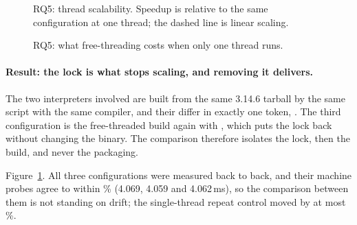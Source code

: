 \begin{figure}[t]
  \centering
  \caption{RQ5: thread scalability. Speedup is relative to the same configuration at one
    thread; the dashed line is linear scaling.}
  \label{fig:threads}
\end{figure}

\begin{figure}[t]
  \centering
  \caption{RQ5: what free-threading costs when only one thread runs.}
  \label{fig:fttax}
\end{figure}

\paragraph{Result: the lock is what stops scaling, and removing it delivers.}
The two interpreters involved are built from the same 3.14.6 tarball by the same script with
the same compiler, and their  differ in exactly one token,
. The third configuration is the free-threaded build again with
, which puts the lock back without changing the binary. The comparison
therefore isolates the lock, then the build, and never the packaging.

Figure~\ref{fig:threads}. All three configurations were measured back to back, and their
machine probes agree to within \% (4.069, 4.059 and 4.062\,ms), so the comparison between
them is not standing on drift; the single-thread repeat control moved by at most \,\%.

